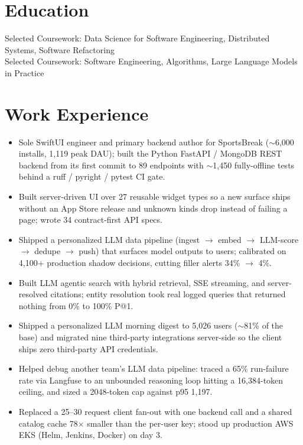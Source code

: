 \documentclass[11pt, letterpaper]{article}
\begin{document}

\section{Education}
Selected Coursework: Data Science for Software Engineering, Distributed Systems, Software Refactoring\\[1pt]
Selected Coursework: Software Engineering, Algorithms, Large Language Models in Practice

\section{Work Experience}
\begin{itemize}
  \item Sole SwiftUI engineer and primary backend author for SportsBreak ($\sim$6{,}000 installs, 1{,}119 peak DAU); built the Python FastAPI / MongoDB REST backend from its first commit to 89 endpoints with $\sim$1{,}450 fully-offline tests behind a ruff / pyright / pytest CI gate.
  \item Built server-driven UI over 27 reusable widget types so a new surface ships without an App Store release and unknown kinds drop instead of failing a page; wrote 34 contract-first API specs.
  \item Shipped a personalized LLM data pipeline (ingest $\to$ embed $\to$ LLM-score $\to$ dedupe $\to$ push) that surfaces model outputs to users; calibrated on 4{,}100+ production shadow decisions, cutting filler alerts 34\% $\to$ 4\%.
  \item Built LLM agentic search with hybrid retrieval, SSE streaming, and server-resolved citations; entity resolution took real logged queries that returned nothing from 0\% to 100\% P@1.
  \item Shipped a personalized LLM morning digest to 5{,}026 users ($\sim$81\% of the base) and migrated nine third-party integrations server-side so the client ships zero third-party API credentials.
  \item Helped debug another team's LLM data pipeline: traced a 65\% run-failure rate via Langfuse to an unbounded reasoning loop hitting a 16{,}384-token ceiling, and sized a 2048-token cap against p95 1{,}197.
  \item Replaced a 25--30 request client fan-out with one backend call and a shared catalog cache 78$\times$ smaller than the per-user key; stood up production AWS EKS (Helm, Jenkins, Docker) on day 3.
\end{itemize}
\end{document}
